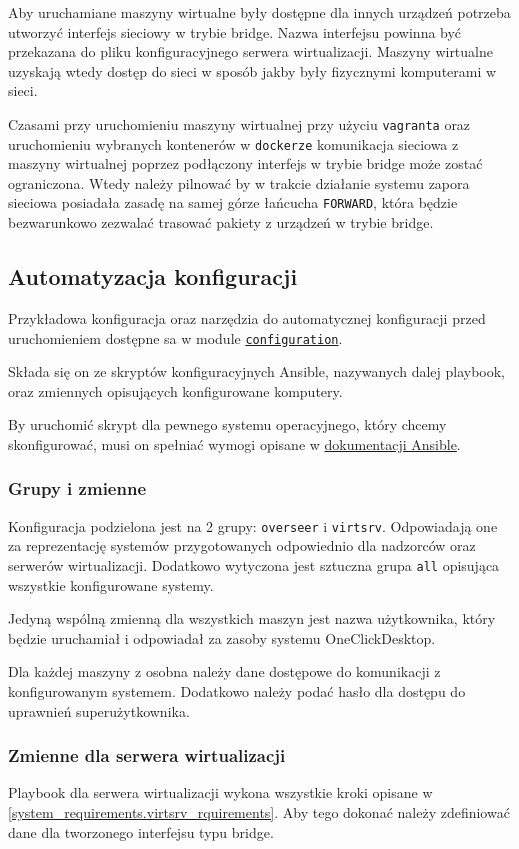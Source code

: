 \documentclass[../opis-rozwiazania.tex]{subfiles}
\begin{document}
Aby uruchamiane maszyny wirtualne były dostępne dla innych urządzeń potrzeba utworzyć interfejs sieciowy w trybie bridge.
Nazwa interfejsu powinna być przekazana do pliku konfiguracyjnego serwera wirtualizacji.
Maszyny wirtualne uzyskają wtedy dostęp do sieci w sposób jakby były fizycznymi komputerami w sieci.

Czasami przy uruchomieniu maszyny wirtualnej przy użyciu \texttt{vagranta} oraz uruchomieniu wybranych kontenerów w \texttt{dockerze} komunikacja sieciowa z maszyny wirtualnej poprzez podłączony interfejs w trybie bridge może zostać ograniczona. Wtedy należy pilnować by w trakcie działanie systemu zapora sieciowa posiadała zasadę na samej górze łańcucha \texttt{FORWARD}, która będzie bezwarunkowo zezwalać trasować pakiety z urządzeń w trybie bridge. 

\subsection{Automatyzacja konfiguracji}
\label{system_requirements.ansible_conf}
Przykładowa konfiguracja oraz narzędzia do automatycznej konfiguracji przed uruchomieniem dostępne sa w module \href{https://github.com/one-click-desktop/configuration}{\texttt{configuration}}.

Składa się on ze skryptów konfiguracyjnych Ansible, nazywanych dalej playbook, oraz zmiennych opisujących konfigurowane komputery.

By uruchomić skrypt dla pewnego systemu operacyjnego, który chcemy skonfigurować, musi on spełniać wymogi opisane w \href{https://docs.ansible.com/ansible/latest/plugins/connection.html#connection-plugins}{dokumentacji Ansible}.

\subsubsection{Grupy i zmienne}
Konfiguracja podzielona jest na 2 grupy: \texttt{overseer} i \texttt{virtsrv}.
Odpowiadają one za reprezentację systemów przygotowanych odpowiednio dla nadzorców oraz serwerów wirtualizacji.
Dodatkowo wytyczona jest sztuczna grupa \texttt{all} opisująca wszystkie konfigurowane systemy.

Jedyną wspólną zmienną dla wszystkich maszyn jest nazwa użytkownika, który będzie uruchamiał i odpowiadał za zasoby systemu OneClickDesktop.

Dla każdej maszyny z osobna należy dane dostępowe do komunikacji z konfigurowanym systemem. Dodatkowo należy podać hasło dla dostępu do uprawnień superużytkownika.

\subsubsection{Zmienne dla serwera wirtualizacji}
Playbook dla serwera wirtualizacji wykona wszystkie kroki opisane w \ref{system_requirements.virtsrv_rquirements}.
Aby tego dokonać należy zdefiniować dane dla tworzonego interfejsu typu bridge.
	
\end{document}

